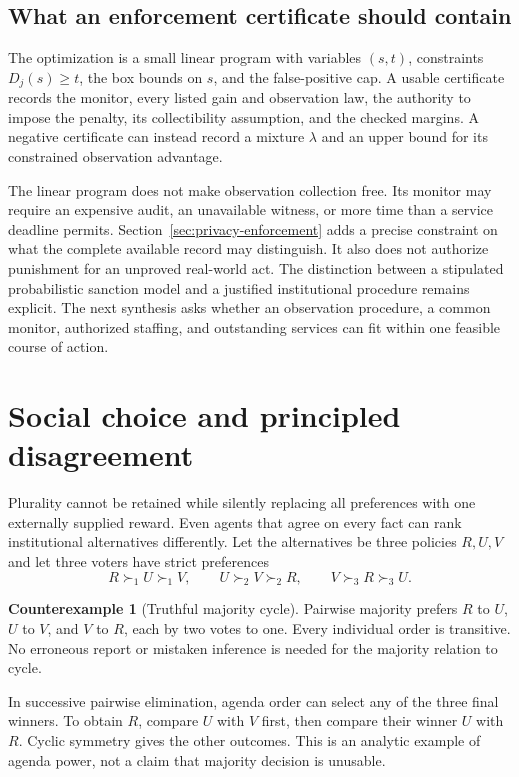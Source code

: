 \documentclass[11pt,letterpaper]{article}
\theoremstyle{plain}
\theoremstyle{definition}
\newtheorem{counterexample}[proposition]{Counterexample}
\theoremstyle{remark}
\begin{document}
\subsection{What an enforcement certificate should contain}
The optimization is a small linear program with variables $(s,t)$, constraints $D_j(s)\geq t$, the box bounds on $s$, and the false-positive cap. A usable certificate records the monitor, every listed gain and observation law, the authority to impose the penalty, its collectibility assumption, and the checked margins. A negative certificate can instead record a mixture $\lambda$ and an upper bound for its constrained observation advantage.

The linear program does not make observation collection free. Its monitor may require an expensive audit, an unavailable witness, or more time than a service deadline permits. Section~\ref{sec:privacy-enforcement} adds a precise constraint on what the complete available record may distinguish. It also does not authorize punishment for an unproved real-world act. The distinction between a stipulated probabilistic sanction model and a justified institutional procedure remains explicit. The next synthesis asks whether an observation procedure, a common monitor, authorized staffing, and outstanding services can fit within one feasible course of action.
\FloatBarrier

\section{Social choice and principled disagreement}\label{sec:choice}
Plurality cannot be retained while silently replacing all preferences with one externally supplied reward. Even agents that agree on every fact can rank institutional alternatives differently. Let the alternatives be three policies $R,U,V$ and let three voters have strict preferences
\[
R\succ_1 U\succ_1 V,\qquad
U\succ_2 V\succ_2 R,\qquad
V\succ_3 R\succ_3 U.
\]

\begin{counterexample}[Truthful majority cycle]\label{ex:majority}
Pairwise majority prefers $R$ to $U$, $U$ to $V$, and $V$ to $R$, each by two votes to one. Every individual order is transitive. No erroneous report or mistaken inference is needed for the majority relation to cycle.
\end{counterexample}

In successive pairwise elimination, agenda order can select any of the three final winners. To obtain $R$, compare $U$ with $V$ first, then compare their winner $U$ with $R$. Cyclic symmetry gives the other outcomes. This is an analytic example of agenda power, not a claim that majority decision is unusable.
\end{document}
